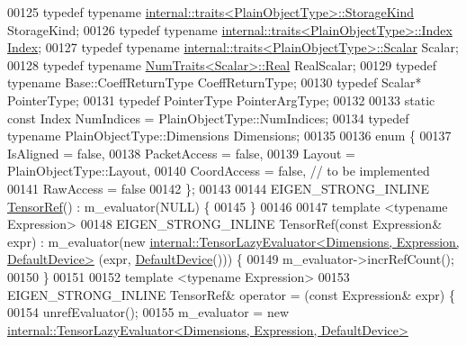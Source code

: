 \begin{DoxyCode}
00125     \textcolor{keyword}{typedef} \textcolor{keyword}{typename} \hyperlink{struct_eigen_1_1internal_1_1traits}{internal::traits<PlainObjectType>::StorageKind}
       StorageKind;
00126     \textcolor{keyword}{typedef} \textcolor{keyword}{typename} \hyperlink{struct_eigen_1_1internal_1_1traits}{internal::traits<PlainObjectType>::Index} 
      \hyperlink{namespace_eigen_a62e77e0933482dafde8fe197d9a2cfde}{Index};
00127     \textcolor{keyword}{typedef} \textcolor{keyword}{typename} \hyperlink{struct_eigen_1_1internal_1_1traits}{internal::traits<PlainObjectType>::Scalar} 
      Scalar;
00128     \textcolor{keyword}{typedef} \textcolor{keyword}{typename} \hyperlink{group___core___module_struct_eigen_1_1_num_traits}{NumTraits<Scalar>::Real} RealScalar;
00129     \textcolor{keyword}{typedef} \textcolor{keyword}{typename} Base::CoeffReturnType CoeffReturnType;
00130     \textcolor{keyword}{typedef} Scalar* PointerType;
00131     \textcolor{keyword}{typedef} PointerType PointerArgType;
00132 
00133     \textcolor{keyword}{static} \textcolor{keyword}{const} Index NumIndices = PlainObjectType::NumIndices;
00134     \textcolor{keyword}{typedef} \textcolor{keyword}{typename} PlainObjectType::Dimensions Dimensions;
00135 
00136     \textcolor{keyword}{enum} \{
00137       IsAligned = \textcolor{keyword}{false},
00138       PacketAccess = \textcolor{keyword}{false},
00139       Layout = PlainObjectType::Layout,
00140       CoordAccess = \textcolor{keyword}{false},  \textcolor{comment}{// to be implemented}
00141       RawAccess = \textcolor{keyword}{false}
00142     \};
00143 
00144     EIGEN\_STRONG\_INLINE \hyperlink{class_eigen_1_1_tensor_ref}{TensorRef}() : m\_evaluator(NULL) \{
00145     \}
00146 
00147     \textcolor{keyword}{template} <\textcolor{keyword}{typename} Expression>
00148     EIGEN\_STRONG\_INLINE TensorRef(\textcolor{keyword}{const} Expression& expr) : m\_evaluator(\textcolor{keyword}{new} 
      \hyperlink{class_eigen_1_1internal_1_1_tensor_lazy_evaluator}{internal::TensorLazyEvaluator<Dimensions, Expression, DefaultDevice>}
      (expr, \hyperlink{struct_eigen_1_1_default_device}{DefaultDevice}())) \{
00149       m\_evaluator->incrRefCount();
00150     \}
00151 
00152     \textcolor{keyword}{template} <\textcolor{keyword}{typename} Expression>
00153     EIGEN\_STRONG\_INLINE TensorRef& operator = (\textcolor{keyword}{const} Expression& expr) \{
00154       unrefEvaluator();
00155       m\_evaluator = \textcolor{keyword}{new} 
      \hyperlink{class_eigen_1_1internal_1_1_tensor_lazy_evaluator}{internal::TensorLazyEvaluator<Dimensions, Expression, DefaultDevice>}

\end{DoxyCode}
